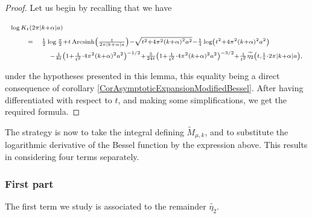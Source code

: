 \documentclass{jams-l}
\theoremstyle{definition}
\theoremstyle{remark}
\numberwithin{equation}{section}
\DeclareMathOperator{\arcsinh}{Arcsinh}
\begin{document}
            \begin{proof}
            
                Let us begin by recalling that we have
                
                \[ \begin{array}{lll}
                        \multicolumn{3}{l}{\scriptstyle \log K_t \left( 2 \pi \left \vert k + \alpha \right \vert a \right)} \\[0.5em]
                        
                        \quad & \scriptstyle = & \scriptstyle \frac{1}{2} \log \frac{\pi}{2} + t \arcsinh \left( \frac{t}{2 \pi \left \vert k + \alpha \right \vert a} \right) - \sqrt{t^2 + 4 \pi^2 \left( k + \alpha \right)^2 a^2} - \frac{1}{4} \log \left( t^2 + 4 \pi^2 \left( k + \alpha \right)^2 a^2 \right) \\[0.5em]
                        
                        && \quad \scriptstyle - \frac{1}{8t} \left( 1 + \frac{1}{t^2} \cdot 4 \pi^2 \left( k + \alpha \right)^2 a^2 \right)^{-1/2} + \frac{5}{24t} \left( 1 + \frac{1}{t^2} \cdot 4 \pi^2 \left( k + \alpha \right)^2 a^2 \right)^{-3/2} + \frac{1}{t^2} \widetilde{\eta_2} \left( t, \frac{1}{t} \cdot 2 \pi \left \vert k + \alpha \right \vert a \right),
                    \end{array} \]
                
                \noindent under the hypotheses presented in this lemma, this equality being a direct consequence of corollary \ref{CorAsymptoticExpansionModifiedBessel}. After having differentiated with respect to $t$, and making some simplifications, we get the required formula.
            
            \end{proof}
            
            The strategy is now to take the integral defining $\widetilde{M}_{\mu,k}$, and to substitute the logarithmic derivative of the Bessel function by the expression above. This results in considering four terms separately.
            
            
            \subsubsection*{\textbf{First part}}
            \label{MTildeFirstPart}
            
                The first term we study is associated to the remainder $\widetilde{\eta_2}$.
                
\end{document}
